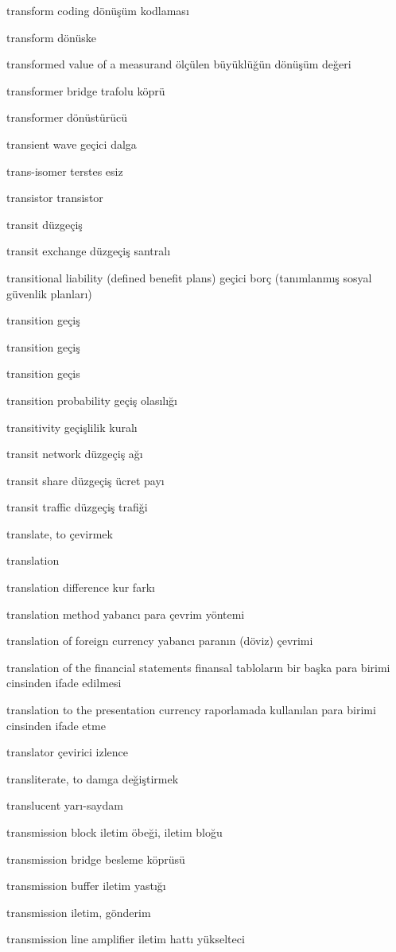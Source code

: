 \documentclass[12pt,fleqn]{article}\usepackage{../../common}
\begin{document}
transform coding dönüşüm kodlaması

transform dönüske

transformed value of a measurand ölçülen büyüklüğün dönüşüm değeri

transformer bridge trafolu köprü

transformer dönüstürücü

transient wave geçici dalga

trans-isomer terstes esiz

transistor transistor

transit düzgeçiş

transit exchange düzgeçiş santralı

transitional liability (defined benefit plans) geçici borç (tanımlanmış sosyal güvenlik planları)

transition geçiş

transition geçiş

transition geçis

transition probability geçiş olasılığı

transitivity geçişlilik kuralı

transit network düzgeçiş ağı

transit share düzgeçiş ücret payı

transit traffic düzgeçiş trafiği

translate, to çevirmek

translation

translation difference kur farkı

translation method yabancı para çevrim yöntemi

translation of foreign currency yabancı paranın (döviz) çevrimi

translation of the financial statements finansal tabloların bir başka para birimi cinsinden ifade edilmesi

translation to the presentation currency raporlamada kullanılan para birimi cinsinden ifade etme

translator çevirici izlence

transliterate, to damga değiştirmek

translucent yarı-saydam

transmission block iletim öbeği, iletim bloğu

transmission bridge besleme köprüsü

transmission buffer iletim yastığı

transmission iletim, gönderim

transmission line amplifier iletim hattı yükselteci
\end{document}
